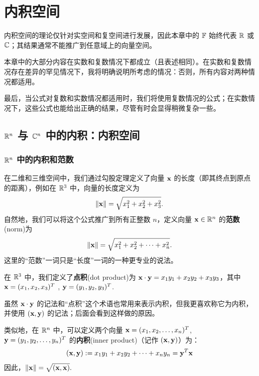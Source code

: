 


\chapter{内积空间}\label{chap:05}

内积空间的理论仅针对实空间和复空间进行发展，因此本章中的 $\mathbb{F}$ 始终代表 $\mathbb{R}$ 或 $\mathbb{C}$；其结果通常不能推广到任意域上的向量空间。

本章中的大部分内容在实数和复数情况下都成立（且表述相同）。在实数和复数情况存在差异的罕见情况下，我将明确说明所考虑的情况：否则，所有内容对两种情况都适用。

最后，当公式对复数和实数情况都适用时，我们将使用复数情况的公式；在实数情况下，这些公式也能给出正确的结果，尽管有时会显得稍微复杂一些。

\section{\texorpdfstring{$\mathbb{R}^n$ 与 $\mathbb{C}^n$ 中的内积：内积空间}{R^n 与 C^n 中的内积：内积空间}}\label{sec:05-01}

\subsection{\texorpdfstring{$\mathbb{R}^n$ 中的内积和范数}{R^n 中的内积和范数}}\label{sec:05-01-01}

在二维和三维空间中，我们通过勾股定理定义了向量 $\mathbf{x}$ 的长度（即其终点到原点的距离），例如在 $\mathbb{R}^3$ 中，向量的长度定义为
$$\| \mathbf{x} \| = \sqrt{x_1^2 + x_2^2 + x_3^2}.$$
自然地，我们可以将这个公式推广到所有正整数 $n$，定义向量 $\mathbf{x} \in \mathbb{R}^n$ 的\textbf{范数}(norm)为 $$\| \mathbf{x} \| = \sqrt{x_1^2 + x_2^2 + \dots + x_n^2}.$$
这里的“范数”一词只是“长度”一词的一种更专业的说法。


在 $\mathbb{R}^3$ 中，我们定义了\textbf{点积}(dot product)为 $\mathbf{x} \cdot \mathbf{y} = x_1 y_1 + x_2 y_2 + x_3 y_3$，其中 $\mathbf{x} = (x_1, x_2, x_3)^T$ , $\mathbf{y} = (y_1, y_2, y_3)^T$.~

\begin{remark*}
虽然 $\mathbf{x}\cdot\mathbf{y}$ 的记法和“点积”这个术语也常用来表示内积，但我更喜欢称它为内积，并使用 $(\mathbf{x},\mathbf{y})$ 的记法；后面会看到这样做的原因。
\end{remark*}

类似地，在 $\mathbb{R}^n$ 中，可以定义两个向量 $\mathbf{x} = (x_1, x_2, \dots, x_n)^T$, $\mathbf{y} = (y_1, y_2, \dots, y_n)^T$ 的\textbf{内积}(inner product)（记作 $(\mathbf{x}, \mathbf{y})$）为：
$$(\mathbf{x}, \mathbf{y}) := x_1 y_1 + x_2 y_2 + \dots + x_n y_n = \mathbf{y}^T \mathbf{x}$$
因此，$\| \mathbf{x} \| = \sqrt{(\mathbf{x}, \mathbf{x})}.$

